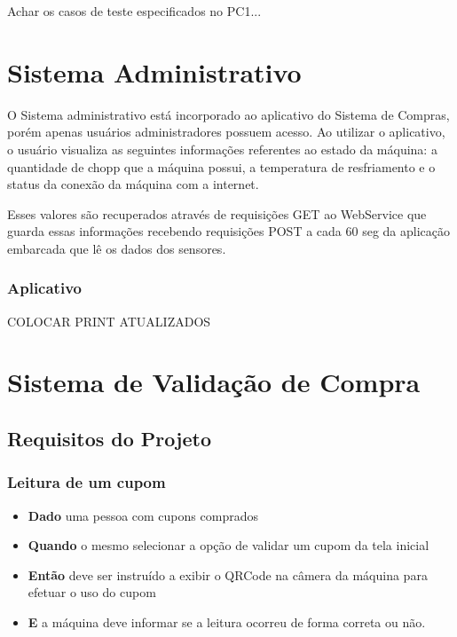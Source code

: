 Achar os casos de teste especificados no PC1...

\section[Sistema Administrativo]{Sistema Administrativo}

O Sistema administrativo está incorporado ao aplicativo do Sistema de Compras, porém apenas usuários
administradores possuem acesso. Ao utilizar o aplicativo, o usuário visualiza
as seguintes informações referentes ao estado da máquina: a quantidade de chopp que a
máquina possui, a temperatura de resfriamento e o status da conexão da máquina com a internet.

Esses valores são recuperados através de requisições GET ao WebService que guarda essas informações recebendo
requisições POST a cada 60 seg da aplicação embarcada que lê os dados dos sensores. 

\subsubsection{Aplicativo}

COLOCAR PRINT ATUALIZADOS

\section[Sistema de Validação de Compra]{Sistema de Validação de Compra}
\subsection[Requisitos do Projeto]{Requisitos do Projeto}
\subsubsection[Leitura de um cupom]{Leitura de um cupom}
\begin{itemize}
    \item \textbf{Dado} uma pessoa com cupons comprados
    \item \textbf{Quando} o mesmo selecionar a opção de validar um cupom da tela inicial
    \item \textbf{Então} deve ser instruído a exibir o QRCode na câmera da máquina para
    efetuar o uso do cupom
    \item \textbf{E} a máquina deve informar se a leitura ocorreu de forma correta ou não.
\end{itemize}

